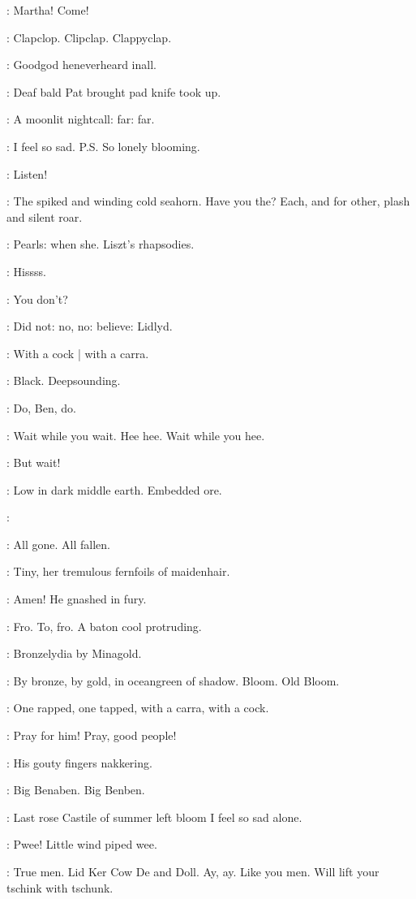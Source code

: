 \BloomInt:
Martha!
Come!

:
Clapclop.
Clipclap.
Clappyclap.

\BloomInt:
Goodgod heneverheard inall.

:
Deaf bald Pat brought pad knife
took up.

\BloomInt:
A moonlit nightcall:
far:
far.

\BloomInt:
I feel so sad.
P.S. So lonely blooming.

:
Listen!

\BloomInt:
The spiked and winding cold seahorn.
Have you the?
Each, and for other,
plash and silent roar.

\BloomInt:
Pearls: when she.
Liszt's rhapsodies.

:
Hissss.

\BloomInt:
You don't?

\BloomInt:
Did not:
no, no:
believe:
Lidlyd.

:
With a cock |
with a carra.

\BloomInt:
Black.
Deepsounding.

\simon:
Do, Ben, do.

\BloomInt:
Wait while you wait.
Hee hee.
Wait while you hee.

\BloomInt:
But wait!

\BloomInt:
Low in dark middle earth.
Embedded ore.

\BloomInt:

\BloomInt:
All gone.
All fallen.

\BloomInt:
Tiny, her tremulous fernfoils of maidenhair.

:
Amen!
He gnashed in fury.

:
Fro.
To, fro.
A baton cool protruding.

\BloomInt:
Bronzelydia by Minagold.

:
By bronze,
by gold,
in oceangreen of shadow.
Bloom.
Old Bloom.

:
One rapped,
one tapped,
with a carra,
with a cock.

\BloomInt:
Pray for him!
Pray, good people!

\dollard:
His gouty fingers nakkering.

\simon:
Big Benaben.
Big Benben.

\BloomInt:
Last rose Castile of summer left bloom I feel so sad alone.

\BloomInt:
Pwee!
Little wind piped wee.

\BloomInt:
True men.
Lid Ker Cow De and Doll.
Ay, ay.
Like you men.
Will lift your tschink with tschunk.

